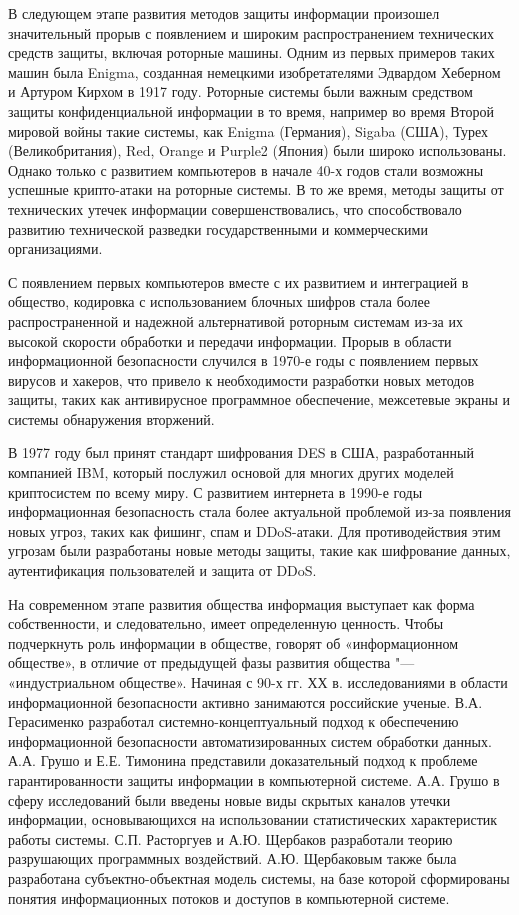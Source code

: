 В следующем этапе развития методов защиты информации произошел значительный прорыв с появлением и широким распространением 
технических средств защиты, включая роторные машины. Одним из первых примеров таких машин была Enigma, созданная немецкими 
изобретателями Эдвардом Хеберном и Артуром Кирхом в 1917 году. Роторные системы были важным средством защиты конфиденциальной 
информации в то время, например во время Второй мировой войны такие системы, как Enigma (Германия), Sigaba (США), Турех 
(Великобритания), Red, Orange и Purple2 (Япония) были широко использованы. Однако только с развитием компьютеров в начале 
40-х годов стали возможны успешные крипто-атаки на роторные системы. В то же время, методы защиты от технических утечек 
информации совершенствовались, что способствовало развитию технической разведки государственными и коммерческими 
организациями.

С появлением первых компьютеров вместе с их развитием и интеграцией в общество, кодировка с использованием блочных шифров стала более распространенной и надежной альтернативой роторным системам из-за их высокой скорости обработки и передачи 
информации. Прорыв в области информационной безопасности случился в 1970-е годы с появлением первых вирусов и хакеров, что 
привело к необходимости разработки новых методов защиты, таких как антивирусное программное обеспечение, межсетевые экраны и 
системы обнаружения вторжений.

В 1977 году был принят стандарт шифрования DES в США, разработанный компанией IBM, который послужил основой для многих других 
моделей криптосистем по всему миру. С развитием интернета в 1990-е годы информационная безопасность стала более актуальной 
проблемой из-за появления новых угроз, таких как фишинг, спам и DDoS-атаки. Для противодействия этим угрозам были разработаны 
новые методы защиты, такие как шифрование данных, аутентификация пользователей и защита от DDoS\cite{sforum}.

На современном этапе развития общества информация выступает как форма собственности, и следовательно, имеет определенную 
ценность. Чтобы подчеркнуть роль информации в обществе, говорят об «информационном обществе», в отличие от предыдущей фазы 
развития общества "---  «индустриальном обществе». Начиная с 90-х гг. ХХ в. исследованиями в области информационной безопасности 
активно занимаются российские ученые. В.А. Герасименко разработал системно-концептуальный подход к обеспечению информационной 
безопасности автоматизированных систем обработки данных. А.А. Грушо и Е.Е. Тимонина представили доказательный подход к 
проблеме гарантированности защиты информации в компьютерной системе. А.А. Грушо в сферу исследований были введены новые виды 
скрытых каналов утечки информации, основывающихся на использовании статистических характеристик работы системы. С.П. 
Расторгуев и А.Ю. Щербаков разработали теорию разрушающих программных воздействий. А.Ю. Щербаковым также была разработана 
субъектно-объектная модель системы, на базе которой сформированы понятия информационных потоков и доступов в компьютерной 
системе. 

